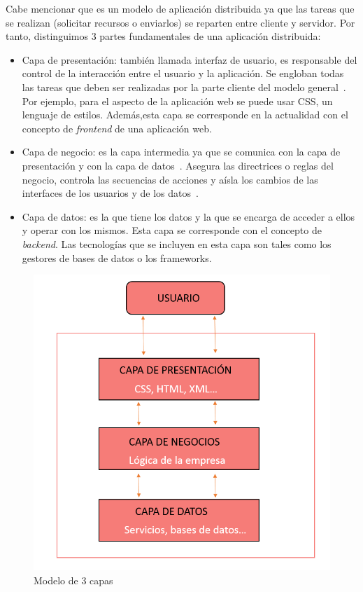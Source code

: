 \documentclass[a4paper, 12pt]{book}
\begin{document}
Cabe mencionar que es un modelo de aplicación distribuida ya que las tareas que se realizan (solicitar recursos o enviarlos) se reparten entre cliente y servidor. Por tanto, distinguimos 3 partes fundamentales de una aplicación distribuida:
\begin{itemize}
    \item Capa de presentación: también llamada interfaz de usuario, es responsable del control de la interacción entre el usuario y la aplicación. Se engloban todas las tareas que deben ser realizadas por la parte cliente del modelo general~\cite{marini2012modelo}. Por ejemplo, para el aspecto de la aplicación web se puede usar CSS, un lenguaje de estilos. Además,esta capa se corresponde en la actualidad con el concepto de \textit{frontend} de una aplicación web.
    \item Capa de negocio: es la capa intermedia ya que se comunica con la capa de presentación y con la capa de datos~\cite{bazurto2018arquitectura}. Asegura las directrices o reglas del negocio, controla las secuencias de acciones y aísla los cambios de las interfaces de los usuarios y de los datos~\cite{marini2012modelo}.
    \item Capa de datos: es la que tiene los datos y la que se encarga de acceder a ellos y operar con los mismos. Esta capa se corresponde con el concepto de \textit{backend}. Las tecnologías que se incluyen en esta capa son tales como los gestores de bases de datos o los frameworks.
\end{itemize}
\begin{figure}[h]
        \centering
        \includegraphics[scale=0.4]{img/3capas.png}
        \caption{Modelo de 3 capas}
        \label{figura:3capas}
\end{figure}
\end{document}
